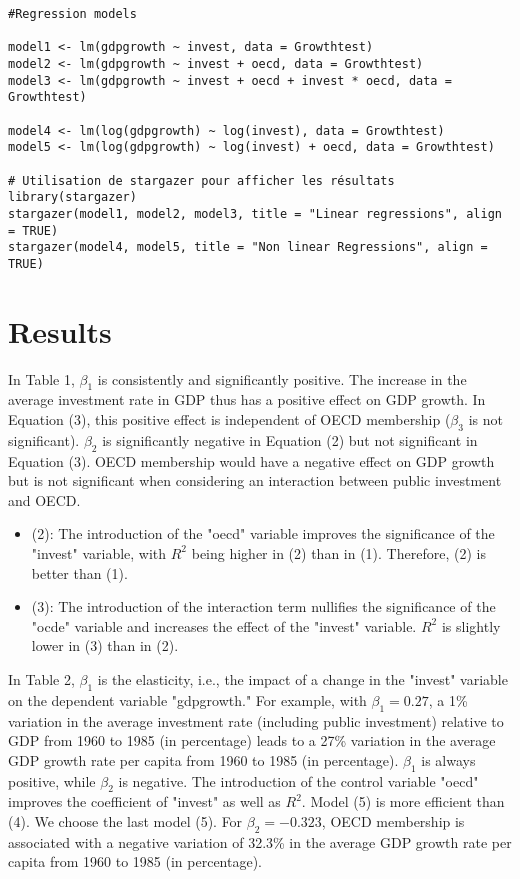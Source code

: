 \documentclass[12pt,fleqn]{report}
\begin{document}
\begin{lstlisting}
#Regression models

model1 <- lm(gdpgrowth ~ invest, data = Growthtest)
model2 <- lm(gdpgrowth ~ invest + oecd, data = Growthtest)
model3 <- lm(gdpgrowth ~ invest + oecd + invest * oecd, data = Growthtest)

model4 <- lm(log(gdpgrowth) ~ log(invest), data = Growthtest)
model5 <- lm(log(gdpgrowth) ~ log(invest) + oecd, data = Growthtest)

# Utilisation de stargazer pour afficher les résultats
library(stargazer)
stargazer(model1, model2, model3, title = "Linear regressions", align = TRUE)
stargazer(model4, model5, title = "Non linear Regressions", align = TRUE)
\end{lstlisting}

\section*{Results}

In Table 1, $\beta_1$ is consistently and significantly positive. The increase in the average investment rate in GDP thus has a positive effect on GDP growth. In Equation (3), this positive effect is independent of OECD membership ($\beta_3$ is not significant). $\beta_2$ is significantly negative in Equation (2) but not significant in Equation (3). OECD membership would have a negative effect on GDP growth but is not significant when considering an interaction between public investment and OECD.
\begin{itemize}
    \item (2): The introduction of the "oecd" variable improves the significance of the "invest" variable, with $R^2$ being higher in (2) than in (1). Therefore, (2) is better than (1).
    \item (3): The introduction of the interaction term nullifies the significance of the "ocde" variable and increases the effect of the "invest" variable. $R^2$ is slightly lower in (3) than in (2).
\end{itemize}
In Table 2, $\beta_1$ is the elasticity, i.e., the impact of a change in the "invest" variable on the dependent variable "gdpgrowth." For example, with $\beta_1 = 0.27$, a 1\% variation in the average investment rate (including public investment) relative to GDP from 1960 to 1985 (in percentage) leads to a 27\% variation in the average GDP growth rate per capita from 1960 to 1985 (in percentage).
$\beta_1$ is always positive, while $\beta_2$ is negative. The introduction of the control variable "oecd" improves the coefficient of "invest" as well as $R^2$. Model (5) is more efficient than (4).
We choose the last model (5). For $\beta_2 = -0.323$, OECD membership is associated with a negative variation of 32.3\% in the average GDP growth rate per capita from 1960 to 1985 (in percentage).
\end{document}
